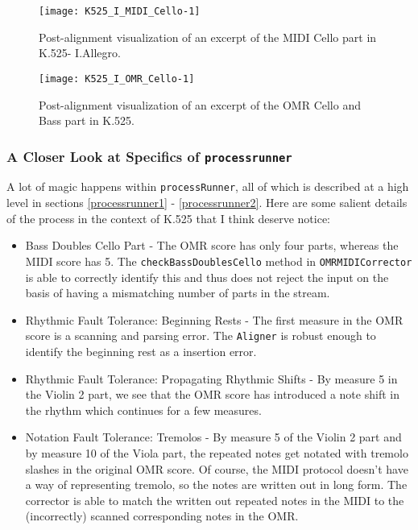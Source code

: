 \begin{figure}[H]
\centering
\texttt{[image: K525\_I\_MIDI\_Cello-1]}
\caption[K.525- I.Allegro MIDI Cello alignment]{Post-alignment visualization of an excerpt of the MIDI Cello part in K.525- I.Allegro.}
\end{figure}

\begin{figure}[H]
\centering
\texttt{[image: K525\_I\_OMR\_Cello-1]}
\caption[K.525- I.Allegro OMR Cello alignment]{Post-alignment visualization of an excerpt of the OMR Cello and Bass part in K.525.}
\end{figure}

\subsubsection{A Closer Look at Specifics of \texttt{processrunner}}
A lot of magic happens within \texttt{processRunner}, all of which is described at a high level in sections \ref{processrunner1} - \ref{processrunner2}. Here are some salient details of the process in the context of K.525 that I think deserve notice:
\begin{itemize}
\item Bass Doubles Cello Part - The OMR score has only four parts, whereas the MIDI score has 5. The \texttt{checkBassDoublesCello} method in \texttt{OMRMIDICorrector} is able to correctly identify this and thus does not reject the input on the basis of having a mismatching number of parts in the stream. 
\item Rhythmic Fault Tolerance: Beginning Rests - The first measure in the OMR score is a scanning and parsing error. The \texttt{Aligner} is robust enough to identify the beginning rest as a insertion error. 
\item Rhythmic Fault Tolerance: Propagating Rhythmic Shifts - By measure 5 in the Violin 2 part, we see that the OMR score has introduced a  note shift in the rhythm which continues for a few measures. 
\item Notation Fault Tolerance: Tremolos - By measure 5 of the Violin 2 part and by measure 10 of the Viola part, the repeated  notes get notated with tremolo slashes in the original OMR score. Of course, the MIDI protocol doesn't have a way of representing tremolo, so the notes are written out in long form. The corrector is able to match the written out repeated notes in the MIDI to the (incorrectly) scanned corresponding notes in the OMR. 
\end{itemize}

